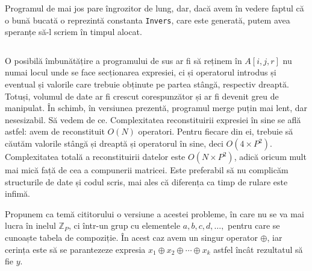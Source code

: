 Programul de mai jos pare îngrozitor de lung, dar, dacă avem în vedere faptul
că o bună bucată o reprezintă constanta {\tt Invers}, care este generată,
putem avea speranțe să-l scriem în timpul alocat.

\inputminted{pascal}{src/problem10-2.pas}

O posibilă îmbunătățire a programului de sus ar fi să reținem în $A[i,j,r]$ nu
numai locul unde se face secționarea expresiei, ci și operatorul introdus și
eventual și valorile care trebuie obținute pe partea stângă, respectiv
dreaptă. Totuși, volumul de date ar fi crescut corespunzător și ar fi devenit
greu de manipulat. În schimb, în versiunea prezentă, programul merge puțin mai
lent, dar nesesizabil. Să vedem de ce. Complexitatea reconstituirii expresiei
în sine se află astfel: avem de reconstituit $O(N)$ operatori. Pentru fiecare
din ei, trebuie să căutăm valorile stângă și dreaptă și operatorul în sine,
deci $O(4 \times P^2)$. Complexitatea totală a reconstituirii datelor este
$O(N \times P^2)$, adică oricum mult mai mică față de cea a compunerii
matricei. Este preferabil să nu complicăm structurile de date și codul scris,
mai ales că diferența ca timp de rulare este infimă.

Propunem ca temă cititorului o versiune a acestei probleme, în care nu se va
mai lucra în inelul $\mathbb{Z}_P$, ci într-un grup cu elementele $a, b, c, d,
\dots,$ pentru care se cunoaște tabela de compoziție. În acest caz avem un
singur operator $\oplus$, iar cerința este să se parantezeze expresia $x_1
\oplus x_2 \oplus \cdots \oplus x_k$ astfel încât rezultatul să fie $y$.
